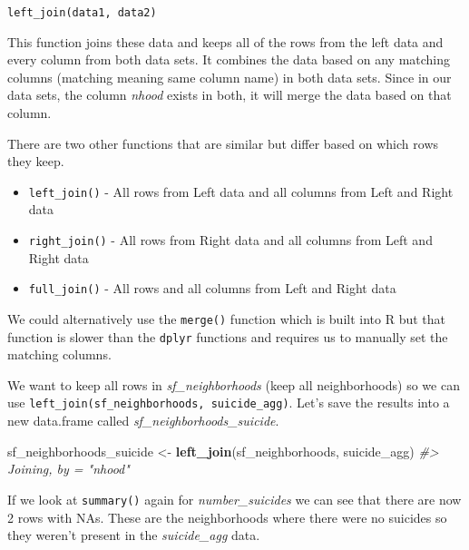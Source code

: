 \documentclass[
  12pt,
]{book}
\newenvironment{Shaded}{\begin{snugshade}}{\end{snugshade}}
\newcommand{\CommentTok}[1]{\textcolor[rgb]{0.56,0.35,0.01}{\textit{#1}}}
\newcommand{\KeywordTok}[1]{\textcolor[rgb]{0.13,0.29,0.53}{\textbf{#1}}}
\newcommand{\NormalTok}[1]{#1}
\newcommand{\OperatorTok}[1]{\textcolor[rgb]{0.81,0.36,0.00}{\textbf{#1}}}
\newcommand{\StringTok}[1]{\textcolor[rgb]{0.31,0.60,0.02}{#1}}
\providecommand{\tightlist}{%
  \setlength{\itemsep}{0pt}\setlength{\parskip}{0pt}}
\begin{document}
\texttt{left\_join(data1,\ data2)}

This function joins these data and keeps all of the rows from the left data and every column from both data sets. It combines the data based on any matching columns (matching meaning same column name) in both data sets. Since in our data sets, the column \emph{nhood} exists in both, it will merge the data based on that column.

There are two other functions that are similar but differ based on which rows they keep.

\begin{itemize}
\tightlist
\item
  \texttt{left\_join()} - All rows from Left data and all columns from Left and Right data
\item
  \texttt{right\_join()} - All rows from Right data and all columns from Left and Right data
\item
  \texttt{full\_join()} - All rows and all columns from Left and Right data
\end{itemize}

We could alternatively use the \texttt{merge()} function which is built into R but that function is slower than the \texttt{dplyr} functions and requires us to manually set the matching columns.

We want to keep all rows in \emph{sf\_neighborhoods} (keep all neighborhoods) so we can use \texttt{left\_join(sf\_neighborhoods,\ suicide\_agg)}. Let's save the results into a new data.frame called \emph{sf\_neighborhoods\_suicide}.

\begin{Shaded}
\begin{Highlighting}[]
\NormalTok{sf\_neighborhoods\_suicide <{-}}\StringTok{ }\KeywordTok{left\_join}\NormalTok{(sf\_neighborhoods, suicide\_agg)}
\CommentTok{\#> Joining, by = "nhood"}
\end{Highlighting}
\end{Shaded}

If we look at \texttt{summary()} again for \emph{number\_suicides} we can see that there are now 2 rows with NAs. These are the neighborhoods where there were no suicides so they weren't present in the \emph{suicide\_agg} data.

\begin{Shaded}
\end{Shaded}
\end{document}
